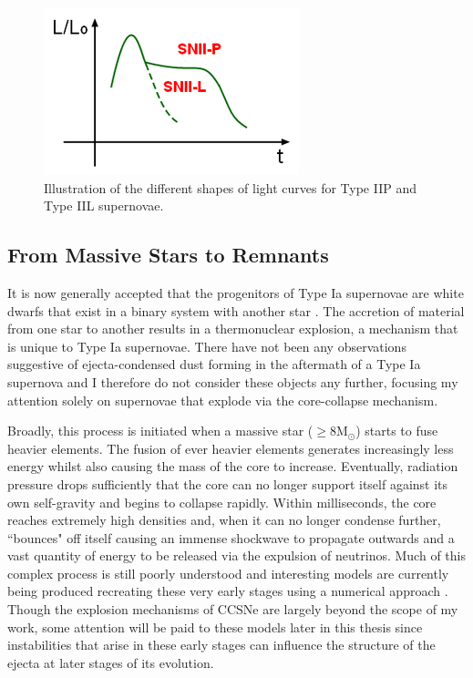 \begin{figure}
\centering
\includegraphics[clip=true, scale = 1, trim=0 0 0 0]{chapters/chapter1/figs/light_curves.png}
\caption{Illustration of the different shapes of light curves for Type IIP and Type IIL supernovae.}
\label{fig:light_curves}
\end{figure}

\subsection{From Massive Stars to Remnants}

It is now generally accepted that the progenitors of Type Ia supernovae are white dwarfs that exist in a binary system with another star \citep{Wang2012}.  The accretion of material from one star to another results in a thermonuclear explosion, a mechanism that is unique to Type Ia supernovae.  There have not been any observations suggestive of ejecta-condensed dust forming in the aftermath of a Type Ia supernova and I therefore do not consider these objects any further, focusing my attention solely on supernovae that explode via the core-collapse mechanism.  

Broadly, this process is initiated when a massive star ($\ge 8$M$_{\odot}$) starts to fuse heavier elements. The fusion of ever heavier elements generates increasingly less energy whilst also causing the mass of the core to increase.  Eventually, radiation pressure drops sufficiently that the core can no longer support itself against its own self-gravity and begins to collapse rapidly. Within milliseconds, the core reaches extremely high densities and, when it can no longer condense further, ``bounces" off itself causing  an immense shockwave to propagate outwards and a vast quantity of energy to be released via the expulsion of neutrinos.  Much of this complex process is still poorly understood and interesting models are currently being produced recreating these very early stages using a numerical approach \citep{Hammer2010,Takiwaki2014,Wongwathanarat2015}.  Though the explosion mechanisms of CCSNe are largely beyond the scope of my work, some attention will be paid to these models later in this thesis since instabilities that arise in these early stages can influence the structure of the ejecta at later stages of its evolution.

